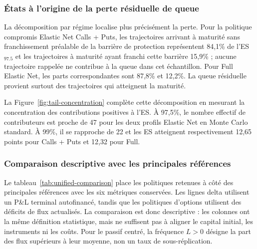 \subsubsection*{États à l'origine de la perte résiduelle de queue}

La décomposition par régime localise plus précisément la perte. Pour la politique compromis Elastic Net Calls + Puts, les trajectoires arrivant à maturité sans franchissement préalable de la barrière de protection représentent 84,1\% de l'ES$_{97.5}$ et les trajectoires à maturité ayant franchi cette barrière 15,9\% ; aucune trajectoire rappelée ne contribue à la queue dans cet échantillon. Pour Full Elastic Net, les parts correspondantes sont 87,8\% et 12,2\%. La queue résiduelle provient surtout des trajectoires qui atteignent la maturité.


La Figure~\ref{fig:tail-concentration} complète cette décomposition en mesurant la concentration des contributions positives à l'ES. À 97,5\%, le nombre effectif de contributeurs est proche de 47 pour les deux profils Elastic Net en Monte Carlo standard. À 99\%, il se rapproche de 22 et les ES atteignent respectivement 12,65 points pour Calls + Puts et 12,32 pour Full.

\subsubsection*{Comparaison descriptive avec les principales références}

Le tableau~\ref{tab:unified-comparison} place les politiques retenues à côté des
principales références avec les six métriques conservées. Les lignes delta utilisent
un P\&L terminal autofinancé, tandis que les politiques d'options utilisent des
déficits de flux actualisés. La comparaison est donc descriptive : les colonnes ont
la même définition statistique, mais ne suffisent pas à aligner le capital initial,
les instruments ni les coûts. Pour le passif centré, la fréquence $L>0$ désigne la
part des flux supérieurs à leur moyenne, non un taux de sous-réplication.

